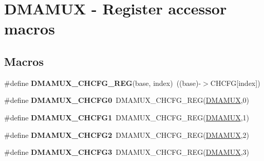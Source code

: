 \hypertarget{group__DMAMUX__Register__Accessor__Macros}{}\section{D\+M\+A\+M\+UX -\/ Register accessor macros}
\label{group__DMAMUX__Register__Accessor__Macros}
\subsection*{Macros}
\begin{DoxyCompactItemize}
\item 
\#define {\bfseries D\+M\+A\+M\+U\+X\+\_\+\+C\+H\+C\+F\+G\+\_\+\+R\+EG}(base,  index)~((base)-\/$>$C\+H\+C\+FG\mbox{[}index\mbox{]})\hypertarget{group__DMAMUX__Register__Accessor__Macros_ga246b1b8df42388bb02a10a8c043f3f4b}{}\label{group__DMAMUX__Register__Accessor__Macros_ga246b1b8df42388bb02a10a8c043f3f4b}

\item 
\#define {\bfseries D\+M\+A\+M\+U\+X\+\_\+\+C\+H\+C\+F\+G0}~D\+M\+A\+M\+U\+X\+\_\+\+C\+H\+C\+F\+G\+\_\+\+R\+EG(\hyperlink{group__DMAMUX__Peripheral__Access__Layer_ga0b7b7bd666a76aa791434bb59ea03693}{D\+M\+A\+M\+UX},0)\hypertarget{group__DMAMUX__Register__Accessor__Macros_gaf1b9c5ddea4b98f2bbe2679878579c15}{}\label{group__DMAMUX__Register__Accessor__Macros_gaf1b9c5ddea4b98f2bbe2679878579c15}

\item 
\#define {\bfseries D\+M\+A\+M\+U\+X\+\_\+\+C\+H\+C\+F\+G1}~D\+M\+A\+M\+U\+X\+\_\+\+C\+H\+C\+F\+G\+\_\+\+R\+EG(\hyperlink{group__DMAMUX__Peripheral__Access__Layer_ga0b7b7bd666a76aa791434bb59ea03693}{D\+M\+A\+M\+UX},1)\hypertarget{group__DMAMUX__Register__Accessor__Macros_gade1efccfbb28dfd338600665129d4b99}{}\label{group__DMAMUX__Register__Accessor__Macros_gade1efccfbb28dfd338600665129d4b99}

\item 
\#define {\bfseries D\+M\+A\+M\+U\+X\+\_\+\+C\+H\+C\+F\+G2}~D\+M\+A\+M\+U\+X\+\_\+\+C\+H\+C\+F\+G\+\_\+\+R\+EG(\hyperlink{group__DMAMUX__Peripheral__Access__Layer_ga0b7b7bd666a76aa791434bb59ea03693}{D\+M\+A\+M\+UX},2)\hypertarget{group__DMAMUX__Register__Accessor__Macros_ga1998089c67f104540eb435c07aced432}{}\label{group__DMAMUX__Register__Accessor__Macros_ga1998089c67f104540eb435c07aced432}

\item 
\#define {\bfseries D\+M\+A\+M\+U\+X\+\_\+\+C\+H\+C\+F\+G3}~D\+M\+A\+M\+U\+X\+\_\+\+C\+H\+C\+F\+G\+\_\+\+R\+EG(\hyperlink{group__DMAMUX__Peripheral__Access__Layer_ga0b7b7bd666a76aa791434bb59ea03693}{D\+M\+A\+M\+UX},3)\hypertarget{group__DMAMUX__Register__Accessor__Macros_gaf6786fc146f407e226ca14ccd1574be6}{}\label{group__DMAMUX__Register__Accessor__Macros_gaf6786fc146f407e226ca14ccd1574be6}


\end{DoxyCompactItemize}
